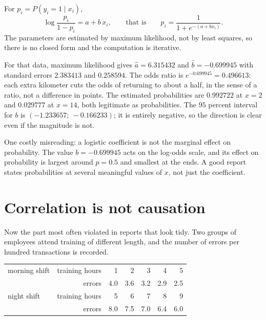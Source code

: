 \begin{definisi}
For $p_i=P(y_i=1\mid x_i)$,
\[
\log\frac{p_i}{1-p_i}=a+b\,x_i,
\qquad\text{that is}\qquad
p_i=\frac{1}{1+e^{-(a+bx_i)}} .
\]
The parameters are estimated by maximum likelihood, not by least squares, so there is no closed
form and the computation is iterative.
\end{definisi}


For that data, maximum likelihood gives $\hat a=6.315432$ and $\hat b=-0.699945$ with standard
errors $2.383413$ and $0.258594$. The odds ratio is $e^{-0.699945}=0.496613$: each extra
kilometer cuts the odds of returning to about a half, in the sense of a ratio, not a difference
in points. The estimated probabilities are $0.992722$ at $x=2$ and $0.029777$ at $x=14$, both
legitimate as probabilities. The $95$ percent interval for $b$ is
$(-1.233657;\ -0.166233)$; it is entirely negative, so the direction is clear even if the
magnitude is not.

One costly misreading: a logistic coefficient is not the marginal effect on probability. The
value $b=-0.699945$ acts on the log-odds scale, and its effect on probability is largest around
$p=0.5$ and smallest at the ends. A good report states probabilities at several meaningful
values of $x$, not just the coefficient.

\section{Correlation is not causation}

Now the part most often violated in reports that look tidy. Two groups of employees attend
training of different length, and the number of errors per hundred transactions is recorded.

\begin{center}
\small
\begin{tabular}{l*{6}{r}}
\hline
morning shift & training hours & 1 & 2 & 3 & 4 & 5 \\
              & errors         & 4.0 & 3.6 & 3.2 & 2.9 & 2.5 \\
\hline
night shift   & training hours & 5 & 6 & 7 & 8 & 9 \\
              & errors         & 8.0 & 7.5 & 7.0 & 6.4 & 6.0 \\
\hline
\end{tabular}
\end{center}

